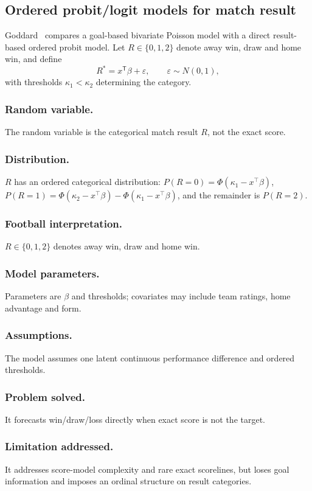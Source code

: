 \documentclass[11pt,a4paper]{amsart}
\numberwithin{equation}{section}
\begin{document}
\subsection{Ordered probit/logit models for match result}
Goddard~\cite{goddard2005} compares a goal-based bivariate Poisson model with a direct result-based ordered probit model. Let $R\in\{0,1,2\}$ denote away win, draw and home win, and define
\begin{equation}R^*=x^{\mathsf T}\beta+\varepsilon,\qquad\varepsilon\sim N(0,1),\end{equation}
with thresholds $\kappa_1<\kappa_2$ determining the category.

\subsubsection*{Random variable.} The random variable is the categorical match result $R$, not the exact score.
\subsubsection*{Distribution.} $R$ has an ordered categorical distribution: $P(R=0)=\Phi(\kappa_1-x^\top\beta)$, $P(R=1)=\Phi(\kappa_2-x^\top\beta)-\Phi(\kappa_1-x^\top\beta)$, and the remainder is $P(R=2)$.
\subsubsection*{Football interpretation.} $R\in\{0,1,2\}$ denotes away win, draw and home win.
\subsubsection*{Model parameters.} Parameters are $\beta$ and thresholds; covariates may include team ratings, home advantage and form.
\subsubsection*{Assumptions.} The model assumes one latent continuous performance difference and ordered thresholds.
\subsubsection*{Problem solved.} It forecasts win/draw/loss directly when exact score is not the target.
\subsubsection*{Limitation addressed.} It addresses score-model complexity and rare exact scorelines, but loses goal information and imposes an ordinal structure on result categories.
\end{document}
